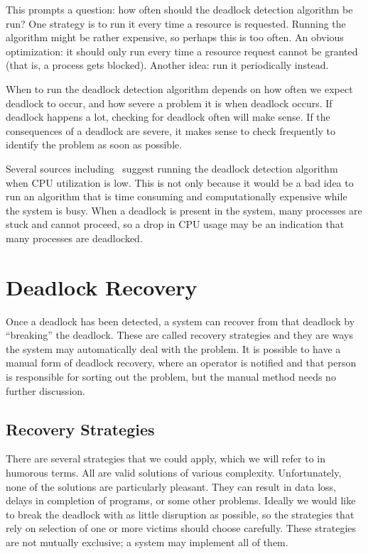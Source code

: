 This prompts a question: how often should the deadlock detection algorithm be run? One strategy is to run it every time a resource is requested. Running the algorithm might be rather expensive, so perhaps this is too often. An obvious optimization: it should only run every time a resource request cannot be granted (that is, a process gets blocked). Another idea: run it periodically instead.

When to run the deadlock detection algorithm depends on how often we expect deadlock to occur, and how severe a problem it is when deadlock occurs. If deadlock happens a lot, checking for deadlock often will make sense. If the consequences of a deadlock are severe, it makes sense to check frequently to identify the problem as soon as possible.

Several sources including~\cite{mos} suggest running the deadlock detection algorithm when CPU utilization is low. This is not only because it would be a bad idea to run an algorithm that is time consuming and computationally expensive while the system is busy. When a deadlock is present in the system, many processes are stuck and cannot proceed, so a drop in CPU usage may be an indication that many processes are deadlocked.

\section*{Deadlock Recovery}
Once a deadlock has been detected, a system can recover from that deadlock by ``breaking'' the deadlock. These are called recovery strategies and they are ways the system may automatically deal with the problem. It is possible to have a manual form of deadlock recovery, where an operator is notified and that person is responsible for sorting out the problem, but the manual method needs no further discussion.

\subsection*{Recovery Strategies}
There are several strategies that we could apply, which we will refer to in humorous terms. All are valid solutions of various complexity. Unfortunately, none of the solutions are particularly pleasant. They can result in data loss, delays in completion of programs, or some other problems.  Ideally we would like to break the deadlock with as little disruption as possible, so the strategies that rely on selection of one or more victims should choose carefully. These strategies are not mutually exclusive; a system may implement all of them.


